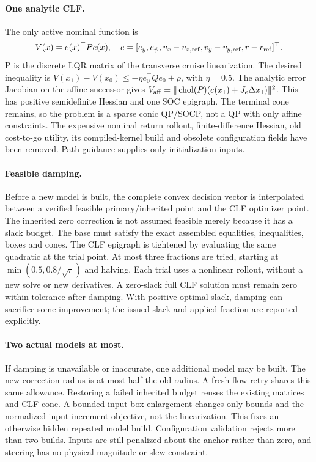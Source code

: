 \documentclass[10pt]{article}
\begin{document}
\paragraph{One analytic CLF.}
The only active nominal function is
\[
 V(x)=e(x)^\top P e(x),\quad
 e=[e_y,e_\psi,v_x-v_{x,\rm ref},v_y-v_{y,\rm ref},r-r_{\rm ref}]^\top.
\]
P is the discrete LQR matrix of the transverse cruise linearization. The desired
inequality is $V(x_1)-V(x_0)\leq-\eta e_0^\top Qe_0+\rho$, with $\eta=0.5$.
The analytic error Jacobian on the affine successor gives
$V_{\rm aff}=\|\operatorname{chol}(P)(e(\bar x_1)+J_e\Delta x_1)\|^2$.
This has positive semidefinite Hessian and one SOC epigraph. The terminal cone
remains, so the problem is a sparse conic QP/SOCP, not a QP with only affine
constraints. The expensive nominal return rollout, finite-difference Hessian,
old cost-to-go utility, its compiled-kernel build and obsolete configuration
fields have been removed. Path guidance supplies only initialization inputs.

\paragraph{Feasible damping.}
Before a new model is built, the complete convex decision vector is interpolated
between a verified feasible primary/inherited point and the CLF optimizer point.
The inherited zero correction is not assumed feasible merely because it has a
slack budget. The base must satisfy the exact assembled equalities, inequalities,
boxes and cones. The CLF epigraph is tightened by evaluating the same quadratic
at the trial point. At most three fractions are tried, starting at
$\min(0.5,0.8/\sqrt{r})$ and halving. Each trial uses a nonlinear rollout, without
a new solve or new derivatives. A zero-slack full CLF solution must remain zero
within tolerance after damping. With positive optimal slack, damping can sacrifice
some improvement; the issued slack and applied fraction are reported explicitly.

\paragraph{Two actual models at most.}
If damping is unavailable or inaccurate, one additional model may be built.
The new correction radius is at most half the old radius. A fresh-flow retry
shares this same allowance. Restoring a failed inherited budget reuses the
existing matrices and CLF cone. A bounded input-box enlargement changes only
bounds and the normalized input-increment objective, not the linearization.
This fixes an otherwise hidden repeated model build. Configuration validation
rejects more than two builds. Inputs are still penalized about the anchor rather
than zero, and steering has no physical magnitude or slew constraint.
\end{document}
